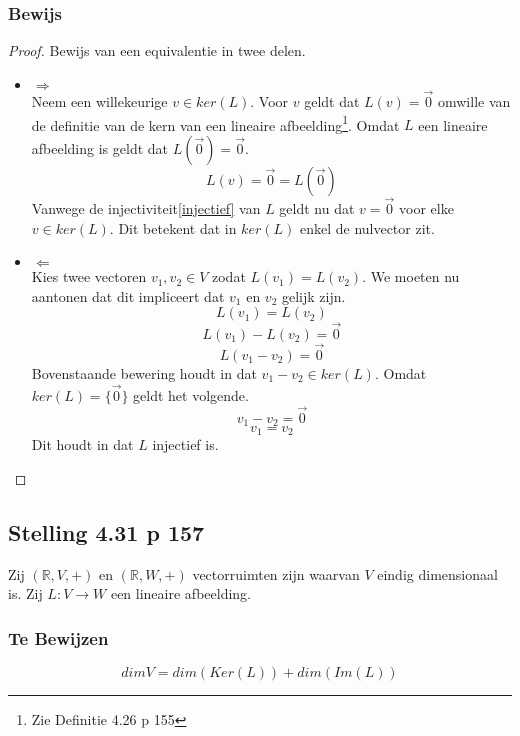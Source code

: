 \documentclass[lineaire_algebra_oplossingen.tex]{subfiles}
\begin{document}
\subsubsection*{Bewijs}
\begin{proof}
Bewijs van een equivalentie in twee delen.
\begin{itemize}
\item $\Rightarrow$\\
Neem een willekeurige $v\in ker(L)$. Voor $v$ geldt dat $L(v) = \vec{0}$ omwille van de definitie van de kern van een lineaire afbeelding\footnote{Zie Definitie 4.26 p 155}. Omdat $L$ een lineaire afbeelding is geldt dat $L(\vec{0}) = \vec{0}$.
\[
L(v) = \vec{0} = L(\vec{0})
\]
Vanwege de injectiviteit\ref{injectief} van $L$ geldt nu dat $v=\vec{0}$ voor elke $v \in ker(L)$. Dit betekent dat in $ker(L)$ enkel de nulvector zit.
\item $\Leftarrow$\\
Kies twee vectoren $v_1,v_2 \in V$ zodat $L(v_1)=L(v_2)$. We moeten nu aantonen dat dit impliceert dat $v_1$ en $v_2$ gelijk zijn.
\[
L(v_1)=L(v_2)
\]
\[
L(v_1)-L(v_2) = \vec{0}
\]
\[
L(v_1-v_2) = \vec{0}
\]
Bovenstaande bewering houdt in dat $v_1-v_2 \in ker(L)$. Omdat $ker(L) = \{\vec{0}\}$ geldt het volgende.
\[
v_1-v_2 = \vec{0}
\]
\[
v_1=v_2
\]
Dit houdt in dat $L$ injectief is.
\end{itemize}
\end{proof}

\subsection{Stelling 4.31 p 157}
Zij $(\mathbb{R},V,+)$ en $(\mathbb{R},W,+)$ vectorruimten zijn waarvan $V$ eindig dimensionaal is. Zij $L:V\rightarrow W$ een lineaire afbeelding.
\subsubsection*{Te Bewijzen}
\[
dimV = dim(Ker(L)) + dim(Im(L))
\]
\end{document}
